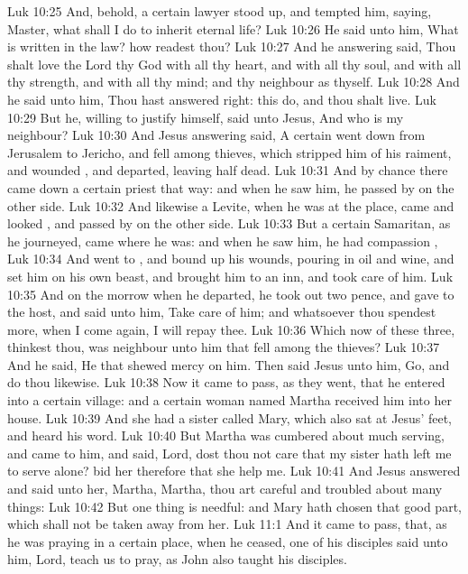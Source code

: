 \vs Luk 10:25 And, behold, a certain lawyer stood up, and tempted him, saying, Master, what shall I do to inherit eternal life?
\vs Luk 10:26 He said unto him, What is written in the law? how readest thou?
\vs Luk 10:27 And he answering said, Thou shalt love the Lord thy God with all thy heart, and with all thy soul, and with all thy strength, and with all thy mind; and thy neighbour as thyself.
\vs Luk 10:28 And he said unto him, Thou hast answered right: this do, and thou shalt live.
\vs Luk 10:29 But he, willing to justify himself, said unto Jesus, And who is my neighbour?
\vs Luk 10:30 And Jesus answering said, A certain  went down from Jerusalem to Jericho, and fell among thieves, which stripped him of his raiment, and wounded , and departed, leaving  half dead.
\vs Luk 10:31 And by chance there came down a certain priest that way: and when he saw him, he passed by on the other side.
\vs Luk 10:32 And likewise a Levite, when he was at the place, came and looked , and passed by on the other side.
\vs Luk 10:33 But a certain Samaritan, as he journeyed, came where he was: and when he saw him, he had compassion ,
\vs Luk 10:34 And went to , and bound up his wounds, pouring in oil and wine, and set him on his own beast, and brought him to an inn, and took care of him.
\vs Luk 10:35 And on the morrow when he departed, he took out two pence, and gave  to the host, and said unto him, Take care of him; and whatsoever thou spendest more, when I come again, I will repay thee.
\vs Luk 10:36 Which now of these three, thinkest thou, was neighbour unto him that fell among the thieves?
\vs Luk 10:37 And he said, He that shewed mercy on him. Then said Jesus unto him, Go, and do thou likewise.
\vs Luk 10:38 Now it came to pass, as they went, that he entered into a certain village: and a certain woman named Martha received him into her house.
\vs Luk 10:39 And she had a sister called Mary, which also sat at Jesus' feet, and heard his word.
\vs Luk 10:40 But Martha was cumbered about much serving, and came to him, and said, Lord, dost thou not care that my sister hath left me to serve alone? bid her therefore that she help me.
\vs Luk 10:41 And Jesus answered and said unto her, Martha, Martha, thou art careful and troubled about many things:
\vs Luk 10:42 But one thing is needful: and Mary hath chosen that good part, which shall not be taken away from her.
\vs Luk 11:1 And it came to pass, that, as he was praying in a certain place, when he ceased, one of his disciples said unto him, Lord, teach us to pray, as John also taught his disciples.
